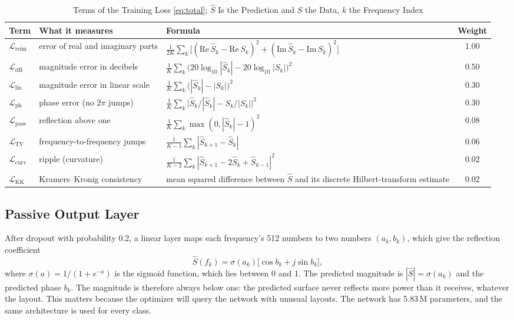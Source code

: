 \documentclass[journal]{IEEEtran}
\newcommand{\Sc}{\hat{S}}
\newcommand{\Lloss}[1]{\mathcal{L}_{\mathrm{#1}}}
\begin{document}
\begin{table}[!t]
\caption{Terms of the Training Loss \eqref{eq:total}; $\Sc$ Is the Prediction and $S$ the Data, $k$ the Frequency Index}
\label{tab:loss}
\centering
\small
\renewcommand{\arraystretch}{1.35}
\begin{tabular}{@{}lllc@{}}
\toprule
Term & What it measures & Formula & Weight \\
\midrule
$\Lloss{reim}$ & error of real and imaginary parts & $\frac{1}{2K}\sum_k\big[(\mathrm{Re}\,\Sc_k-\mathrm{Re}\,S_k)^2+(\mathrm{Im}\,\Sc_k-\mathrm{Im}\,S_k)^2\big]$ & 1.00 \\
$\Lloss{dB}$ & magnitude error in decibels & $\frac{1}{K}\sum_k\big(20\log_{10}|\Sc_k|-20\log_{10}|S_k|\big)^2$ & 0.50 \\
$\Lloss{lin}$ & magnitude error in linear scale & $\frac{1}{K}\sum_k\big(|\Sc_k|-|S_k|\big)^2$ & 0.30 \\
$\Lloss{ph}$ & phase error (no $2\pi$ jumps) & $\frac{1}{K}\sum_k\big|\Sc_k/|\Sc_k|-S_k/|S_k|\big|^2$ & 0.30 \\
$\Lloss{pass}$ & reflection above one & $\frac{1}{K}\sum_k \max(0,|\Sc_k|-1)^2$ & 0.08 \\
$\Lloss{TV}$ & frequency-to-frequency jumps & $\frac{1}{K-1}\sum_k |\Sc_{k+1}-\Sc_k|$ & 0.06 \\
$\Lloss{curv}$ & ripple (curvature) & $\frac{1}{K-2}\sum_k |\Sc_{k+1}-2\Sc_k+\Sc_{k-1}|^2$ & 0.02 \\
$\Lloss{KK}$ & Kramers--Kronig consistency & mean squared difference between $\Sc$ and its discrete Hilbert-transform estimate & 0.02 \\
\bottomrule
\end{tabular}
\end{table}

\subsection{Passive Output Layer}
After dropout with probability 0.2, a linear layer maps each frequency's 512 numbers to two numbers $(a_k,b_k)$, which give the reflection coefficient
\begin{equation}
\Sc(f_k)=\sigma(a_k)\big[\cos b_k+j\sin b_k\big],
\label{eq:polar}
\end{equation}
where $\sigma(a)=1/(1+e^{-a})$ is the sigmoid function, which lies between 0 and 1. The predicted magnitude is $|\Sc|=\sigma(a_k)$ and the predicted phase $b_k$. The magnitude is therefore always below one: the predicted surface never reflects more power than it receives, whatever the layout. This matters because the optimizer will query the network with unusual layouts. The network has 5.83\,M parameters, and the same architecture is used for every class.
\end{document}
